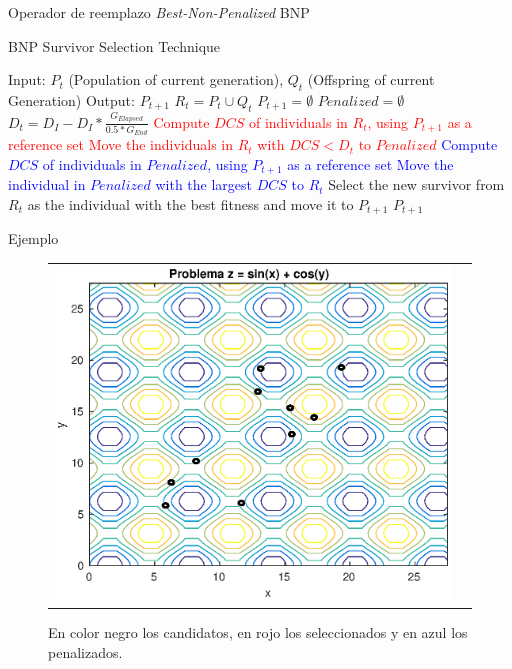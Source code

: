 \documentclass{beamer}
\begin{document}
\begin{frame}{Operador de reemplazo \textit{Best-Non-Penalized} BNP}
\begin{algorithm}[H]
\caption{BNP Survivor Selection Technique} 
\begin{scriptsize}
\begin{algorithmic}
\STATE Input: $P_t$ (Population of current generation), $Q_t$ (Offspring of current Generation)
   	\STATE Output: $P_{t+1}$ 
        \STATE $R_t = P_t \cup Q_t$ 
        \STATE $P_{t+1} = \emptyset$ 
        \STATE $Penalized = \emptyset$ 
				\STATE $D_t = D_I - D_I * \frac{G_{Elapsed}}{0.5*G_{End}}$
         \label{alg:6}
					\STATE \textcolor{red}{Compute $DCS$ of individuals in $R_t$, using $P_{t+1}$ as a reference set}
					\STATE \textcolor{red}{Move the individuals in $R_t$ with $DCS < D_t$ to $Penalized$}
        	 \label{alg:9}
						\STATE \textcolor{blue}{ Compute $DCS$ of individuals in $Penalized$, using $P_{t+1}$ as a reference set}
						\STATE \textcolor{blue}{Move the individual in $Penalized$ with the largest $DCS$ to $R_t$}
        	\ENDIF
					\STATE Select the new survivor from $R_t$ as the individual with the best fitness  and move it to $P_{t+1}$
        \ENDWHILE
    	\RETURN $P_{t+1}$ \label{alg:14}
\end{algorithmic}
\end{scriptsize}
\end{algorithm}
\end{frame}



\begin{frame}{Ejemplo}
\begin{figure}[H]
  \centering
  \begin{tabular}{c c}
   \includegraphics[scale=0.6]{1.eps} 
  \end{tabular}
  \caption{\scriptsize En color negro los candidatos, en rojo los seleccionados y en azul los penalizados.}
\end{figure}
\end{frame}
\end{document}

